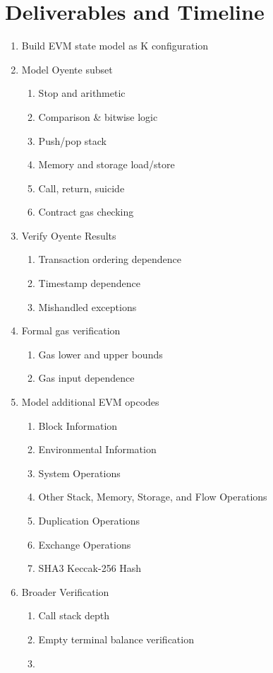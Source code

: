 \section{Deliverables and Timeline}
\begin{enumerate}
\item Build EVM state model as K configuration
\item Model Oyente subset
	\begin{enumerate}	
		\item Stop and arithmetic
		\item Comparison \& bitwise logic
		\item Push/pop stack 
		\item Memory and storage load/store
		\item Call, return, suicide
		\item Contract gas checking
	\end{enumerate}
\item Verify Oyente Results
	\begin{enumerate}
		\item Transaction ordering dependence
		\item Timestamp dependence
		\item Mishandled exceptions
	\end{enumerate}
\item Formal gas verification
	\begin{enumerate}
		\item Gas lower and upper bounds
		\item Gas input dependence
	\end{enumerate}

\item Model additional EVM opcodes
	\begin{enumerate}
		\item Block Information
		\item Environmental Information
		\item System Operations
		\item Other Stack, Memory, Storage, and Flow Operations
		\item Duplication Operations
		\item Exchange Operations
		\item SHA3 Keccak-256 Hash
	\end{enumerate}

\item Broader Verification
	\begin{enumerate}
		\item Call stack depth 
		\item Empty terminal balance verification
		\item {}
	\end{enumerate}
\end{enumerate}
